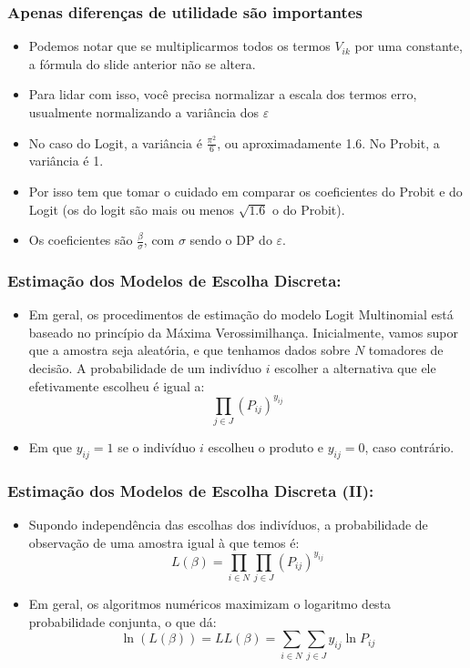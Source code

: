 \documentclass{beamer}
\begin{document}
\begin{frame}[fragile]\frametitle{Apenas diferenças de utilidade são importantes}
\begin{itemize}
	\item Podemos notar que se multiplicarmos todos os termos $V_{ik}$ por uma constante, a fórmula do slide anterior não se altera.
	\item Para lidar com isso, você precisa normalizar a escala dos termos erro, usualmente normalizando a variância dos $\varepsilon$
	\item No caso do Logit, a variância é $\frac{\pi^{2}}{6}$, ou aproximadamente 1.6. No Probit, a variância é 1.
	\item Por isso tem que tomar o cuidado em comparar os coeficientes do Probit e do Logit (os do logit são mais ou menos $\sqrt{1.6}$ o do Probit).
	\item Os coeficientes são $\frac{\beta}{\sigma}$, com $\sigma$ sendo o DP do $\varepsilon$.

\end{itemize}
    
\end{frame}

\begin{frame}\frametitle{Estimação dos Modelos de Escolha Discreta:}
\begin{itemize}
\item Em geral, os procedimentos de estimação do modelo Logit Multinomial
está baseado no princípio da Máxima Verossimilhança. Inicialmente,
vamos supor que a amostra seja aleatória, e que tenhamos dados sobre
$N$ tomadores de decisão. A probabilidade de um indivíduo $i$ escolher
a alternativa que ele efetivamente escolheu é igual a:
\[
\prod_{j\in J}(P_{ij})^{y_{ij}}
\]
\item Em que $y_{ij}=1$ se o indivíduo $i$ escolheu o produto e $y_{ij}=0$,
caso contrário. 
\end{itemize}
\end{frame}

\begin{frame}\frametitle{Estimação dos Modelos de Escolha Discreta (II):}

\begin{itemize}
\item Supondo independência das escolhas dos indivíduos, a probabilidade
de observação de uma amostra igual à que temos é:
\[
L(\beta)=\prod_{i\in N}\prod_{j\in J}(P_{ij})^{y_{ij}}
\]
\item Em geral, os algoritmos numéricos maximizam o logaritmo desta probabilidade
conjunta, o que dá:
\[
\ln(L(\beta))=LL(\beta)=\sum_{i\in N}\sum_{j\in J}y_{ij}\ln P_{ij}
\]
\end{itemize}
\end{frame}
\end{document}
